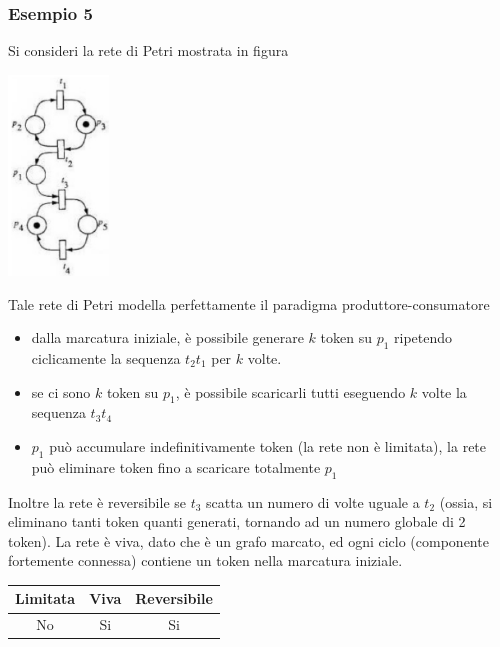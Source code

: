 \documentclass[10pt, letterpaper]{report}
\begin{document}
\subsubsection{Esempio 5}
Si consideri la rete di Petri mostrata in figura
\begin{center}
    \includegraphics[width=0.2\textwidth]{images/PetriEs5.png}
\end{center}
Tale rete di Petri modella perfettamente il paradigma produttore-consumatore\begin{itemize}
    \item dalla marcatura iniziale, è possibile generare $k$ token su $p_1$ ripetendo ciclicamente la sequenza $t_2t_1$ per $k$ volte.
    \item se ci sono $k$ token su $p_1$, è possibile scaricarli tutti eseguendo $k$ volte la sequenza $t_3t_4$
    \item $p_1$ può accumulare indefinitivamente token (la rete non è limitata), la rete può eliminare token fino a scaricare totalmente $p_1$
\end{itemize}
Inoltre la rete è reversibile se $t_3$ scatta un numero di volte uguale a $t_2$ (ossia, si eliminano tanti token quanti generati, tornando ad un numero globale di 2 token). La rete è viva, dato che è un grafo marcato, ed ogni ciclo (componente fortemente connessa) contiene un token nella marcatura iniziale.
\begin{center}
    \begin{tabular}{|c|c|c|}
        \hline
        \rowcolor[HTML]{EFEFEF} 
        Limitata & Viva & Reversibile \\ \hline
        No       & Si   & Si          \\ \hline
        \end{tabular}
\end{center}
\end{document}
